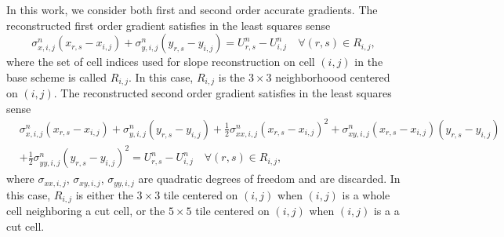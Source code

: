 In this work, we consider both first and second order accurate gradients.  The reconstructed first order gradient satisfies in the least squares sense
\begin{equation}\label{eqn:linrecon_base}
\sigma^n_{x,i,j}(x_{r,s} - x_{i,j}) +
\sigma^n_{y,i,j}(y_{r,s} - y_{i,j})=
U^n_{r,s} - U^n_{i, j} \quad \forall (r,s) \in R_{i,j},
\end{equation}
where the set of cell indices used for slope reconstruction on cell $(i,j)$ in the base scheme is
called $R_{i,j}$.  In this case, $R_{i,j}$ is the $3\times 3$ neighborhoood  centered on $(i,j)$.
The reconstructed second order gradient satisfies in the least squares sense
\begin{equation}
\begin{aligned}\label{eqn:linrecon_base2}
&\sigma^n_{x,i,j}(x_{r,s} - x_{i,j}) +
\sigma^n_{y,i,j}(y_{r,s} - y_{i,j})  + \frac{1}{2}\sigma^n_{xx,i,j}(x_{r,s} - x_{i,j})^2 +\sigma^n_{xy,i,j}(x_{r,s} - x_{i,j})(y_{r,s} - y_{i,j})\\
&+ \frac{1}{2}\sigma^n_{yy,i,j}(y_{r,s} - y_{i,j})^2=
U^n_{r,s} - U^n_{i, j} \quad \forall (r,s) \in R_{i,j},
\end{aligned}
\end{equation}
where $\sigma_{xx,i,j}$, $\sigma_{xy,i,j}$, $\sigma_{yy,i,j}$ are quadratic degrees of freedom and are discarded.  In this case, $R_{i,j}$ is either the $3\times 3$ tile centered on $(i,j)$ when $(i,j)$ is a whole cell neighboring a cut cell, or the $5\times 5$ tile centered on $(i,j)$ when $(i,j)$ is a a cut cell.

